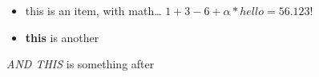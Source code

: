 \begin{itemize}
\item this is an item, with math\dots 
$
1 + 3 - 6 + \alpha * hello = 56.123!
$ \item 
\textbf{this} is another
\end{itemize} 
\emph{AND THIS} is something after
